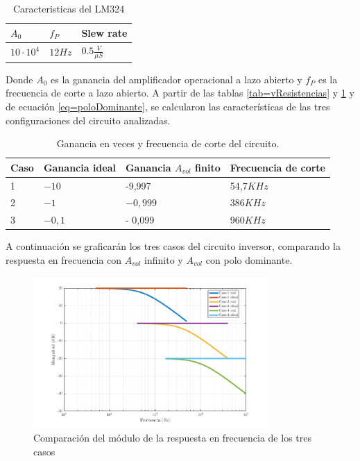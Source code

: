 \documentclass[../../main.tex]{subfiles}
\begin{document}
\begin{table}[h]
\begin{center}
\begin{tabular}{|l|l|l|}
\hline
$A_{0}$ & $f_{P}$ & Slew rate \\
\hline \hline
$10\cdot 10^{4}$& $ 12Hz $ & $0.5 \frac{V}{\mu S}$\\ \hline

\end{tabular}
\caption{Caracteristicas del LM324} 
\label{tab=lm324Carac}
\end{center}
\end{table}
Donde $A_{0}$ es la ganancia del amplificador operacional a lazo abierto y  $f_{P}$ es la frecuencia de corte a lazo abierto. A partir de las tablas \ref{tab=vResistencias} y \ref{tab=lm324Carac} y de ecuación  \ref{eq=poloDominante}, se calcularon las caracter\'isticas de las tres configuraciones del circuito analizadas.

\begin{table}[h]
\begin{center}
\begin{tabular}{|l|l|l|l|}
\hline
Caso &Ganancia ideal & Ganancia $A_{vol}$ finito & Frecuencia de corte\\
\hline \hline
1 & $-10$ & -9,997 & 54,7$KHz$ \\ \hline
2 & $-1$ &  $-0,999 $ &  386$KHz$  \\ \hline
3 & $-0,1$ &- 0,099 &960$KHz$\\ \hline
\end{tabular}
\caption{Ganancia en veces y frecuencia de corte del circuito.} 
\label{tab=gananciayFrecCorte}
\end{center}
\end{table}

A continuación se graficar\'an los tres casos del circuito inversor, comparando la respuesta en frecuencia con $A_{vol}$ infinito y $A_{vol}$ con polo dominante.

\begin{figure}[H]
\centering
\includegraphics[width=0.8\textwidth]{imagenes/real_ideal_mag_inv.png}
\caption{Comparación del m\'odulo de la respuesta en frecuencia de los tres casos}
\end{figure}
\end{document}
